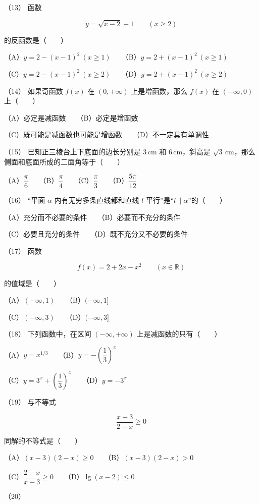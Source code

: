 \begin{answer}
（13） 函数

\nopagebreak[4]
\[
y=\sqrt{x-2}+1\qquad(x\ge2)
\]

的反函数是\mbox{（　　）}

（A）$y=2-(x-1)^2\ (x\ge1)$　　（B）$y=2+(x-1)^2\ (x\ge1)$

（C）$y=2-(x-1)^2\ (x\ge2)$　　（D）$y=2+(x-1)^2\ (x\ge2)$

（14） 如果奇函数 $f(x)$ 在 $(0,+\infty)$ 上是增函数，那么 $f(x)$ 在 $(-\infty,0)$ 上\mbox{（　　）}

（A）必定是减函数　　（B）必定是增函数

（C）既可能是减函数也可能是增函数　　（D）不一定具有单调性

（15） 已知正三棱台上下底面的边长分别是 $3\,\mathrm{cm}$ 和 $6\,\mathrm{cm}$，斜高是 $\sqrt3\,\mathrm{cm}$，那么侧面和底面所成的二面角等于\mbox{（　　）}

（A）$\dfrac\pi6$　　（B）$\dfrac\pi4$　　（C）$\dfrac\pi3$　　（D）$\dfrac{5\pi}{12}$

（16） “平面 $\alpha$ 内有无穷多条直线都和直线 $l$ 平行”是“$l\parallel\alpha$”的\mbox{（　　）}

（A）充分而不必要的条件　　（B）必要而不充分的条件

（C）必要且充分的条件　　（D）既不充分又不必要的条件

（17） 函数

\nopagebreak[4]
\[
f(x)=2+2x-x^2\qquad(x\in\mathbb R)
\]

的值域是\mbox{（　　）}

（A）$(-\infty,1)$　　（B）$(-\infty,1]$

（C）$(-\infty,3)$　　（D）$(-\infty,3]$

（18） 下列函数中，在区间 $(-\infty,+\infty)$ 上是减函数的只有\mbox{（　　）}

（A）$y=x^{1/3}$　　（B）$y=-\left(\dfrac13\right)^x$

（C）$y=3^x+\left(\dfrac13\right)^x$　　（D）$y=-3^x$

（19） 与不等式

\nopagebreak[4]
\[
\frac{x-3}{2-x}\ge0
\]

同解的不等式是\mbox{（　　）}

（A）$(x-3)(2-x)\ge0$　　（B）$(x-3)(2-x)>0$

（C）$\dfrac{2-x}{x-3}\ge0$　　（D）$\lg(x-2)\le0$

（20）　


\end{answer}
